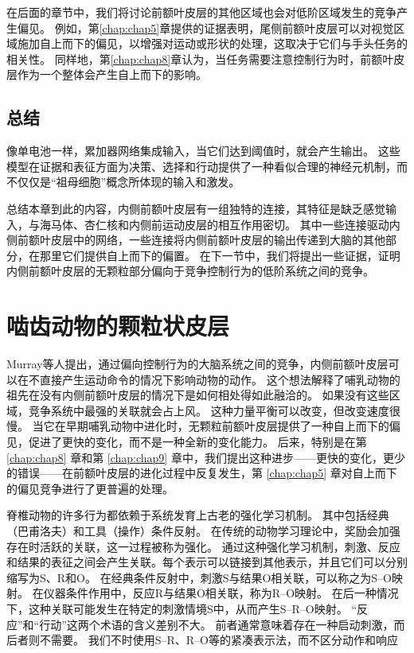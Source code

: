 在后面的章节中，我们将讨论前额叶皮层的其他区域也会对低阶区域发生的竞争产生偏见。
例如，第\ref{chap:chap5}章提供的证据表明，尾侧前额叶皮层可以对视觉区域施加自上而下的偏见，以增强对运动或形状的处理，这取决于它们与手头任务的相关性。
同样地，第\ref{chap:chap8}章认为，当任务需要注意控制行为时，前额叶皮层作为一个整体会产生自上而下的影响。\par



\subsection{总结}

像单电池一样，累加器网络集成输入，当它们达到阈值时，就会产生输出。
这些模型在证据和表征方面为决策、选择和行动提供了一种看似合理的神经元机制，而不仅仅是“祖母细胞”概念所体现的输入和激发。\par


总结本章到此的内容，内侧前额叶皮层有一组独特的连接，其特征是缺乏感觉输入，与海马体、杏仁核和内侧前运动皮层的相互作用密切。
其中一些连接驱动内侧前额叶皮层中的网络，一些连接将内侧前额叶皮层的输出传递到大脑的其他部分，在那里它们提供自上而下的偏置。
在下一节中，我们将提出一些证据，证明内侧前额叶皮层的无颗粒部分偏向于竞争控制行为的低阶系统之间的竞争。\par



\section{啮齿动物的颗粒状皮层}

Murray等人\cite{murray2011can}提出，通过偏向控制行为的大脑系统之间的竞争，内侧前额叶皮层可以在不直接产生运动命令的情况下影响动物的动作。
这个想法解释了哺乳动物的祖先在没有内侧前额叶皮层的情况下是如何相处得如此融洽的。
 如果没有这些区域，竞争系统中最强的关联就会占上风。 这种力量平衡可以改变，但改变速度很慢。
当它在早期哺乳动物中进化时，无颗粒前额叶皮层提供了一种自上而下的偏见，促进了更快的变化，而不是一种全新的变化能力。
后来，特别是在第 \ref{chap:chap8} 章和第 \ref{chap:chap9} 章中，我们提出这种进步——更快的变化，更少的错误——在前额叶皮层的进化过程中反复发生，第 \ref{chap:chap5} 章对自上而下的偏见竞争进行了更普遍的处理。\par


脊椎动物的许多行为都依赖于系统发育上古老的强化学习机制。
其中包括经典（巴甫洛夫）和工具（操作）条件反射\cite{Dickinson 1980}。
在传统的动物学习理论中，奖励会加强存在时活跃的关联，这一过程被称为强化。
通过这种强化学习机制，刺激、反应和结果的表征之间会产生关联。每个表示可以链接到其他表示，并且它们可以分别缩写为S、R和O。
在经典条件反射中，刺激S与结果O相关联，可以称之为S–O映射。
在仪器条件作用中，反应R与结果O相关联，称为R–O映射。
在后一种情况下，这种关联可能发生在特定的刺激情境S中，从而产生S–R–O映射。
“反应”和“行动”这两个术语的含义差别不大。
前者通常意味着存在一种启动刺激，而后者则不需要。
我们不时使用S–R、R–O等的紧凑表示法，而不区分动作和响应\par


